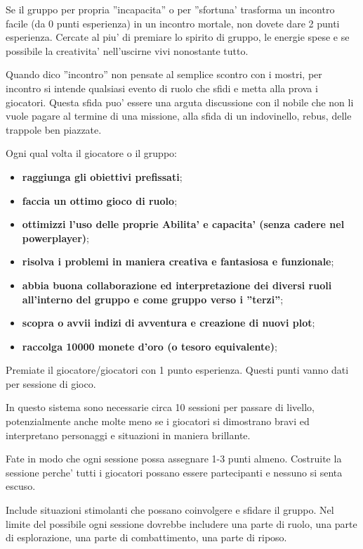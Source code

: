 \documentclass[a4paper,11pt,twoside,openany]{book}
\begin{document}
{Se il gruppo per propria ''incapacita'' o per ''sfortuna' trasforma un incontro facile (da 0 punti esperienza) in un incontro mortale, non dovete dare 2 punti esperienza. Cercate al piu' di premiare lo spirito di gruppo, le energie spese e se possibile la creativita' nell'uscirne vivi  nonostante tutto.

Quando dico ''incontro'' non pensate al semplice scontro con i mostri, per incontro si intende qualsiasi evento di ruolo che sfidi e metta alla prova i giocatori. Questa sfida puo' essere una arguta discussione con il nobile che non li vuole pagare al termine di una missione, alla sfida di un indovinello, rebus, delle trappole ben piazzate.

\bigskip

Ogni qual volta il giocatore o il gruppo:
\begin{itemize}
\item 
\textbf{raggiunga gli obiettivi prefissati}; 
\item 
\textbf{faccia un ottimo gioco di ruolo}; 
\item 
\textbf{ottimizzi l'uso delle proprie Abilita' e capacita' (senza cadere nel powerplayer)}; 
\item 
\textbf{risolva i problemi in maniera creativa e fantasiosa e funzionale}; 
\item 
\textbf{abbia buona collaborazione ed interpretazione dei diversi ruoli all'interno del gruppo e come gruppo verso i ''terzi''}; 
\item 
\textbf{scopra o avvii indizi di avventura e creazione di nuovi plot};
\item
\textbf{raccolga 10000 monete d'oro (o tesoro equivalente)};
\end{itemize}

\bigskip

Premiate il giocatore/giocatori con 1 punto esperienza. Questi punti vanno dati per sessione di gioco.

In questo sistema sono necessarie circa 10 sessioni per passare di livello, potenzialmente anche molte meno se i giocatori si dimostrano bravi ed interpretano personaggi e situazioni in maniera brillante. 

Fate in modo che ogni sessione possa assegnare 1-3 punti almeno. Costruite la sessione perche' tutti i giocatori possano essere partecipanti e nessuno si senta escuso.

Include situazioni stimolanti che possano coinvolgere e sfidare il gruppo.
Nel limite del possibile ogni sessione dovrebbe includere una parte di ruolo, una parte di esplorazione, una parte di combattimento, una parte di riposo.

}
\end{document}
